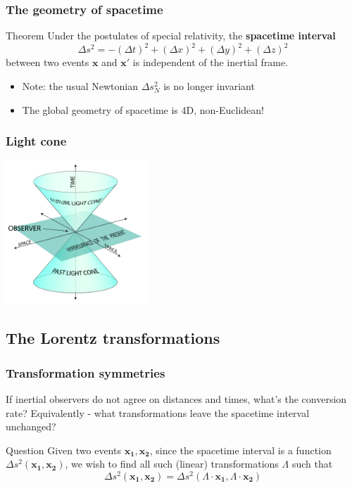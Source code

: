 \documentclass{beamer}
\begin{document}
\begin{frame}
    \frametitle{The geometry of spacetime}
    \begin{block}{Theorem}
        Under the postulates of special relativity, the \textbf{spacetime interval}
        \[\Delta s^2=-(\Delta t)^2+(\Delta x)^2+(\Delta y)^2+(\Delta z)^2\]
        between two events $\mathbf x$ and $\mathbf x'$ is independent of the inertial frame.
    \end{block}
    \begin{itemize}
        \item Note: the usual Newtonian $\Delta s_N^2$ is no longer invariant
        \item The global geometry of spacetime is 4D, non-Euclidean!
    \end{itemize}
\end{frame}

\begin{frame}
    \frametitle{Light cone}
    \begin{center}
        \includegraphics[width=200px]{img/lightcone.png}
    \end{center}
\end{frame}

\subsection{The Lorentz transformations}

\begin{frame}
    \frametitle{Transformation symmetries}
    If inertial observers do not agree on distances and times, what's the conversion rate?
    Equivalently - what transformations leave the spacetime interval unchanged?
    \begin{block}{Question}
        Given two events $\mathbf{x_1},\mathbf{x_2}$, since the spacetime interval
        is a function $\Delta s^2(\mathbf{x_1},\mathbf{x_2})$, we wish to find all such
        (linear) transformations $\Lambda$ such that
        \[\Delta s^2(\mathbf{x_1},\mathbf{x_2})=\Delta s^2(\Lambda\cdot \mathbf{x_1},\Lambda\cdot \mathbf{x_2})\]
    \end{block}
\end{frame}
\end{document}
